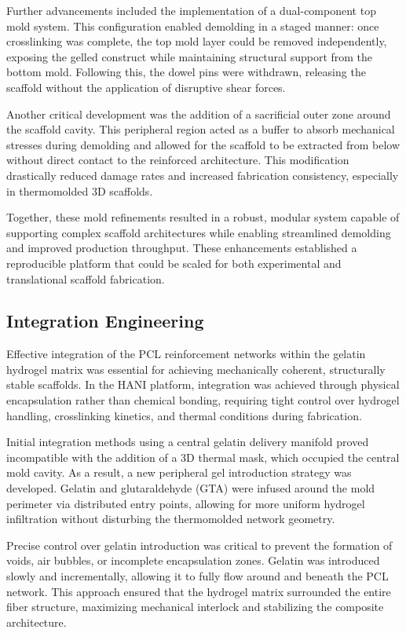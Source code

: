 Further advancements included the implementation of a dual-component top mold system. This configuration enabled demolding in a staged manner: once crosslinking was complete, the top mold layer could be removed independently, exposing the gelled construct while maintaining structural support from the bottom mold. Following this, the dowel pins were withdrawn, releasing the scaffold without the application of disruptive shear forces.

Another critical development was the addition of a sacrificial outer zone around the scaffold cavity. This peripheral region acted as a buffer to absorb mechanical stresses during demolding and allowed for the scaffold to be extracted from below without direct contact to the reinforced architecture. This modification drastically reduced damage rates and increased fabrication consistency, especially in thermomolded 3D scaffolds.

Together, these mold refinements resulted in a robust, modular system capable of supporting complex scaffold architectures while enabling streamlined demolding and improved production throughput. These enhancements established a reproducible platform that could be scaled for both experimental and translational scaffold fabrication.

\subsection{Integration Engineering}

Effective integration of the PCL reinforcement networks within the gelatin hydrogel matrix was essential for achieving mechanically coherent, structurally stable scaffolds. In the HANI platform, integration was achieved through physical encapsulation rather than chemical bonding, requiring tight control over hydrogel handling, crosslinking kinetics, and thermal conditions during fabrication.

Initial integration methods using a central gelatin delivery manifold proved incompatible with the addition of a 3D thermal mask, which occupied the central mold cavity. As a result, a new peripheral gel introduction strategy was developed. Gelatin and glutaraldehyde (GTA) were infused around the mold perimeter via distributed entry points, allowing for more uniform hydrogel infiltration without disturbing the thermomolded network geometry.

Precise control over gelatin introduction was critical to prevent the formation of voids, air bubbles, or incomplete encapsulation zones. Gelatin was introduced slowly and incrementally, allowing it to fully flow around and beneath the PCL network. This approach ensured that the hydrogel matrix surrounded the entire fiber structure, maximizing mechanical interlock and stabilizing the composite architecture.


